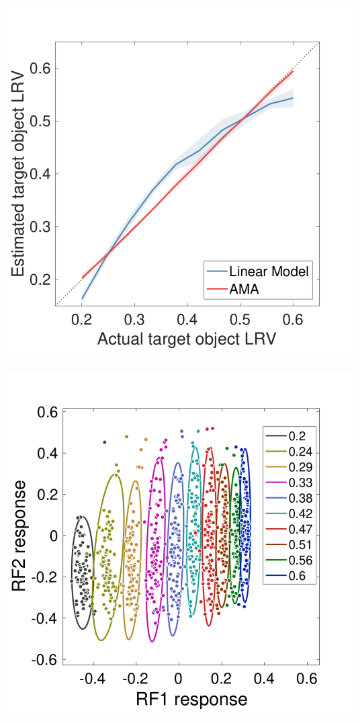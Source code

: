 \documentclass{jov}
\begin{document}
\begin{figure}
\begin{subfigure}[b]{0.22 \textwidth}
        \label{fig:case2RFResponseIsomer}
    \end{subfigure}
            \begin{subfigure}[b]{0.22 \textwidth}
        \caption{  \newline {}}
        \includegraphics[width=\textwidth, trim={0 0 0 1.5cm},clip]{../FiguresDraft5/Figure11/Figure11_c.pdf}
        \label{fig:case2ContrastEstimates}
    \end{subfigure}
            \begin{subfigure}[b]{0.22 \textwidth}
        \caption{  \newline {}}
        \includegraphics[width=\textwidth, trim={0 0 0 1.5cm},clip]{../FiguresDraft5/Figure11/Figure11_d.pdf}

\end{subfigure}
\end{figure}
\end{document}
